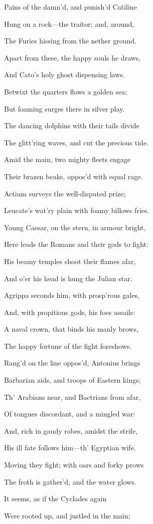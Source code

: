 Pains of the damn’d, and punish’d Catiline

Hung on a rock—the traitor; and, around,

The Furies hissing from the nether ground.

Apart from these, the happy souls he draws,

And Cato’s holy ghost dispensing laws.

Betwixt the quarters flows a golden sea;

But foaming surges there in silver play.

The dancing dolphins with their tails divide

The glitt’ring waves, and cut the precious tide.

Amid the main, two mighty fleets engage

Their brazen beaks, oppos’d with equal rage.

Actium surveys the well-disputed prize;

Leucate’s wat’ry plain with foamy billows fries.

Young Caesar, on the stern, in armour bright,

Here leads the Romans and their gods to fight:

His beamy temples shoot their flames afar,

And o’er his head is hung the Julian star.

Agrippa seconds him, with prosp’rous gales,

And, with propitious gods, his foes assails:

A naval crown, that binds his manly brows,

The happy fortune of the fight foreshows.

Rang’d on the line oppos’d, Antonius brings

Barbarian aids, and troops of Eastern kings;

Th’ Arabians near, and Bactrians from afar,

Of tongues discordant, and a mingled war:

And, rich in gaudy robes, amidst the strife,

His ill fate follows him—th’ Egyptian wife.

Moving they fight; with oars and forky prows

The froth is gather’d, and the water glows.

It seems, as if the Cyclades again

Were rooted up, and justled in the main;

